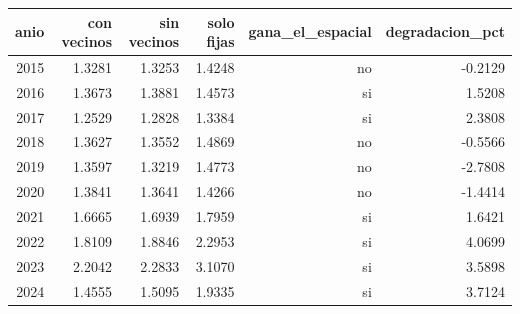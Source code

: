 \begin{tabular}{rrrrrr}
\toprule
anio & con vecinos & sin vecinos & solo fijas & gana\_el\_espacial & degradacion\_pct \\
\midrule
2015 & 1.3281 & 1.3253 & 1.4248 & no & -0.2129 \\
2016 & 1.3673 & 1.3881 & 1.4573 & si & 1.5208 \\
2017 & 1.2529 & 1.2828 & 1.3384 & si & 2.3808 \\
2018 & 1.3627 & 1.3552 & 1.4869 & no & -0.5566 \\
2019 & 1.3597 & 1.3219 & 1.4773 & no & -2.7808 \\
2020 & 1.3841 & 1.3641 & 1.4266 & no & -1.4414 \\
2021 & 1.6665 & 1.6939 & 1.7959 & si & 1.6421 \\
2022 & 1.8109 & 1.8846 & 2.2953 & si & 4.0699 \\
2023 & 2.2042 & 2.2833 & 3.1070 & si & 3.5898 \\
2024 & 1.4555 & 1.5095 & 1.9335 & si & 3.7124 \\
\bottomrule
\end{tabular}
